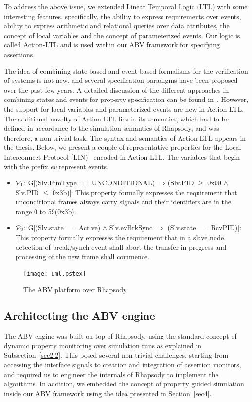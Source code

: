 \documentclass[a4paper, 11pt]{article}
\begin{document}
To address the above issue, we extended Linear
Temporal Logic (LTL) with some interesting features, specifically,
the ability to express requirements over events, ability to express
arithmetic and relational queries over data attributes, 
the concept of local variables and the concept of
parameterized events. Our logic is called Action-LTL and is used
within our ABV framework for specifying assertions. 

The idea of combining state-based and event-based formalisms for the
verification of systems is not new, and several specification paradigms have
been proposed over the past few years.
A detailed discussion of the different approaches in combining states and
events for property specification can be found in~\cite{chaki1}. 
However, the support for local variables and parameterized events 
are new in Action-LTL. 
The additional novelty of Action-LTL lies in its semantics, which had to be 
defined in accordance to the 
simulation semantics of Rhapsody, and was therefore, a non-trivial task. 
The syntax and semantics of Action-LTL appears in the thesis. 
Below, we present a couple of representative properties for the Local 
Interconnect Protocol (LIN)~\cite{lin} encoded in Action-LTL. 
The variables that begin with the prefix {\em ev} represent events.

\begin{itemize}

\item ${\cal P}_1$: G[(Slv.FrmType == UNCONDITIONAL) 
	$\Rightarrow$(Slv.PID $\ge$ 0x00 $\land$ Slv.PID $\le$ 0x3b)]: This 
	property formally expresses the requirement that unconditional frames 
	always carry signals and their identifiers are in the range 0 to 59(0x3b).
\item ${\cal P}_2$: G[(Slv.state == Active) $\land$ Slv.evBrkSync 
	$\Rightarrow$ (Slv.state == RcvPID)]: This property formally expresses 
	the requirement that in a slave node, detection of break/synch event 
	shall abort the transfer in progress and processing of the new frame 
	shall commence.
\end{itemize}

\begin{figure}[htb]
\centering
\texttt{[image: uml.pstex]}
\center
\caption{The ABV platform over Rhapsody} \label{fig5.1}
\end{figure}

\subsection {Architecting the ABV engine} \label{sec7.2}
The ABV engine was built on top of Rhapsody, using the standard concept 
of dynamic property monitoring over simulation runs as explained in 
Subsection~\ref{sec2.2}. This posed several non-trivial challenges, starting 
from accessing the interface signals to creation and integration of 
assertion monitors, and required us to engineer the internals of Rhapsody 
to implement the algorithms. In addition, we embedded the concept of 
property guided simulation inside our ABV framework using the idea presented in Section~\ref{sec4}. 
\end{document}
